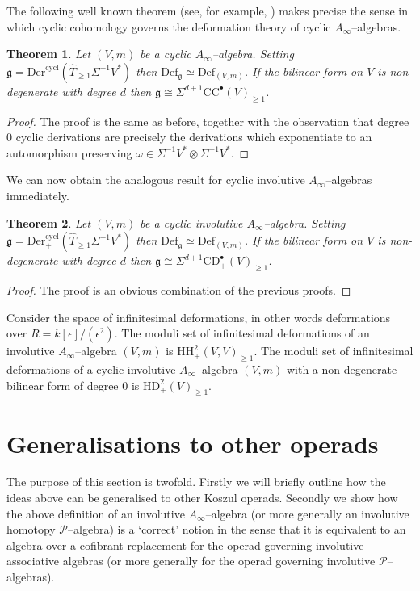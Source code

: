 \documentclass[british]{amsart}
\theoremstyle{plain}
\newtheorem{theorem}{Theorem}[section]
\theoremstyle{definition}
{
\newaliascnt{{definition}}{theorem}\newtheorem{{definition}}[{definition}]{{Definition}}\aliascntresetthe{{definition}}\expandafterautorefname\endcsname{{Definition}}}
{
\newaliascnt{{remark}}{theorem}\newtheorem{{remark}}[{remark}]{{Remark}}\aliascntresetthe{{remark}}\expandafterautorefname\endcsname{{Remark}}}
{
\newaliascnt{{example}}{theorem}\newtheorem{{example}}[{example}]{{Example}}\aliascntresetthe{{example}}\expandafterautorefname\endcsname{{Example}}}
{
\newaliascnt{{examples}}{theorem}\newtheorem{{examples}}[{examples}]{{Examples}}\aliascntresetthe{{examples}}\expandafterautorefname\endcsname{{Examples}}}
{
\newaliascnt{{notation}}{theorem}\newtheorem{{notation}}[{notation}]{{Notation}}\aliascntresetthe{{notation}}\expandafterautorefname\endcsname{{Notation}}}
{
\newaliascnt{{convention}}{theorem}\newtheorem{{convention}}[{convention}]{{Convention}}\aliascntresetthe{{convention}}\expandafterautorefname\endcsname{{Convention}}}
\numberwithin{equation}{section}
\numberwithin{figure}{section}
\begin{document}
The following well known theorem (see, for example, \cite{penkavaschwarz:ainfalgsmodspace}) makes precise the sense in which cyclic cohomology governs the deformation theory of cyclic $A_\infty$--algebras.

\begin{theorem}
Let $(V,m)$ be a cyclic $A_\infty$--algebra. Setting $\mathfrak{g}={\mathrm{Der}}^{\mathrm{cycl}}(\widehat{T}_{\geq 1}\Sigma^{-1}V^*)$ then ${\mathrm{Def}}_{\mathfrak{g}}\simeq {\mathrm{Def}}_{(V,m)}$. If the bilinear form on $V$ is non-degenerate with degree $d$ then $\mathfrak{g}\cong\Sigma^{d+1}{\mathrm{CC}}^\bullet(V)_{\geq 1}$.
\end{theorem}

\begin{proof}
The proof is the same as before, together with the observation that degree $0$ cyclic derivations are precisely the derivations which exponentiate to an automorphism preserving $\omega\in\Sigma^{-1}V^*\otimes \Sigma^{-1}V^*$.
\end{proof}

We can now obtain the analogous result for cyclic involutive $A_\infty$--algebras immediately.

\begin{theorem}
Let $(V,m)$ be a cyclic involutive $A_\infty$--algebra. Setting $\mathfrak{g}={\mathrm{Der}}^{\mathrm{cycl}}_+(\widehat{T}_{\geq 1}\Sigma^{-1}V^*)$ then ${\mathrm{Def}}_{\mathfrak{g}}\simeq {\mathrm{Def}}_{(V,m)}$. If the bilinear form on $V$ is non-degenerate with degree $d$ then $\mathfrak{g}\cong\Sigma^{d+1}{\mathrm{CD}}^\bullet_+(V)_{\geq 1}$.
\end{theorem}

\begin{proof}
The proof is an obvious combination of the previous proofs.
\end{proof}

\begin{example}
Consider the space of infinitesimal deformations, in other words deformations over $R=k[\epsilon]/(\epsilon^2)$. The moduli set of infinitesimal deformations of an involutive $A_{\infty}$--algebra $(V,m)$ is ${\mathrm{HH}}^2_+(V,V)_{\geq 1}$. The moduli set of infinitesimal deformations of a cyclic involutive $A_\infty$--algebra $(V,m)$ with a non-degenerate bilinear form of degree $0$ is ${\mathrm{HD}}_+^2(V)_{\geq 1}$.
\end{example}

\section{Generalisations to other operads}\label{sec:operads}
The purpose of this section is twofold. Firstly we will briefly outline how the ideas above can be generalised to other Koszul operads. Secondly we show how the above definition of an involutive $A_\infty$--algebra (or more generally an involutive homotopy $\mathcal{P}$--algebra) is a `correct' notion in the sense that it is equivalent to an algebra over a cofibrant replacement for the operad governing involutive associative algebras (or more generally for the operad governing involutive $\mathcal{P}$--algebras).
\end{document}
